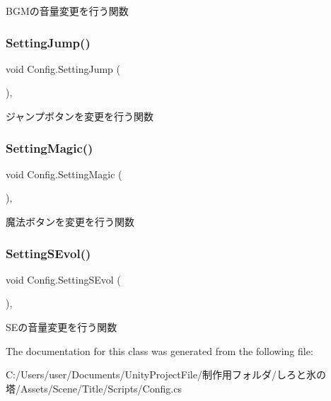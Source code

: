 B\+G\+Mの音量変更を行う関数 

\mbox{\label{class_config_a949c8f8016a13dc0de2ad8478d950840}} 
\subsubsection{\texorpdfstring{Setting\+Jump()}{SettingJump()}}
{\footnotesize\ttfamily void Config.\+Setting\+Jump (\begin{DoxyParamCaption}{ }\end{DoxyParamCaption})\hspace{0.3cm}{\ttfamily [inline]}, {\ttfamily [private]}}



ジャンプボタンを変更を行う関数 

\mbox{\label{class_config_a017861e162f694d0b63034ca0bdd99a5}} 
\subsubsection{\texorpdfstring{Setting\+Magic()}{SettingMagic()}}
{\footnotesize\ttfamily void Config.\+Setting\+Magic (\begin{DoxyParamCaption}{ }\end{DoxyParamCaption})\hspace{0.3cm}{\ttfamily [inline]}, {\ttfamily [private]}}



魔法ボタンを変更を行う関数 

\mbox{\label{class_config_a8a5015567d30dd61658de82526286301}} 
\subsubsection{\texorpdfstring{Setting\+S\+Evol()}{SettingSEvol()}}
{\footnotesize\ttfamily void Config.\+Setting\+S\+Evol (\begin{DoxyParamCaption}{ }\end{DoxyParamCaption})\hspace{0.3cm}{\ttfamily [inline]}, {\ttfamily [private]}}



S\+Eの音量変更を行う関数 



The documentation for this class was generated from the following file\+:\begin{DoxyCompactItemize}
\item 
C\+:/\+Users/user/\+Documents/\+Unity\+Project\+File/制作用フォルダ/しろと氷の塔/\+Assets/\+Scene/\+Title/\+Scripts/Config.\+cs\end{DoxyCompactItemize}
